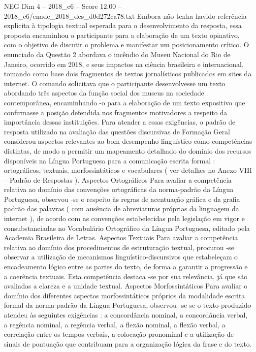 \begin{textsample}{NEG Dim 4 – 2018\_c6 – Score 12.00 – 2018\_c6/enade\_2018\_des\_d0d272ca78.txt}
Embora não tenha havido referência explícita à tipologia textual esperada para o desenvolvimento da resposta, essa proposta encaminhou o participante para a elaboração de um texto opinativo, com o objetivo de discutir o problema e manifestar um posicionamento crítico.
O enunciado da Questão 2 abordava o incêndio do Museu Nacional do Rio de Janeiro, ocorrido em 2018, e seus impactos na ciência brasileira e internacional, tomando como base dois fragmentos de textos jornalísticos publicados em sites da internet.
O comando solicitava que o participante desenvolvesse um texto abordando três aspectos da função social dos museus na sociedade contemporânea, encaminhando -o para a elaboração de um texto expositivo que confirmasse a posição defendida nos fragmentos motivadores a respeito da importância dessas instituições.
Para atender a essas exigências, o padrão de resposta utilizado na avaliação das questões discursivas de Formação Geral considerou aspectos relevantes ao bom desempenho linguístico como competências distintas, de modo a permitir um mapeamento detalhado do domínio dos recursos disponíveis na Língua Portuguesa para a comunicação escrita formal : ortográficos, textuais, morfossintáticos e vocabulares ( ver detalhes no Anexo VIII – Padrão de Respostas ).
Aspectos Ortográficos Para avaliar a competência relativa ao domínio das convenções ortográficas da norma-padrão da Língua Portuguesa, observou -se o respeito às regras de acentuação gráfica e da grafia padrão das palavras ( com ausência de abreviaturas próprias da linguagem da internet ), de acordo com as convenções estabelecidas pela legislação em vigor e consubstanciadas no Vocabulário Ortográfico da Língua Portuguesa, editado pela Academia Brasileira de Letras.
Aspectos Textuais Para avaliar a competência relativa ao domínio dos procedimentos de estruturação textual, procurou -se observar a utilização de mecanismos linguístico-discursivos que estabeleçam o encadeamento lógico entre as partes do texto, de forma a garantir a progressão e a coerência textuais.
Esta competência destaca -se por sua relevância, já que são avaliadas a clareza e a unidade textual.
Aspectos Morfossintáticos Para avaliar o domínio dos diferentes aspectos morfossintáticos próprios da modalidade escrita formal da norma-padrão da Língua Portuguesa, observou -se se o texto produzido atendeu às seguintes exigências : a concordância nominal, a concordância verbal, a regência nominal, a regência verbal, a flexão nominal, a flexão verbal, a correlação entre os tempos verbais, a colocação pronominal e a utilização de sinais de pontuação que contribuam para a organização lógica da frase e do texto.

\end{textsample}
